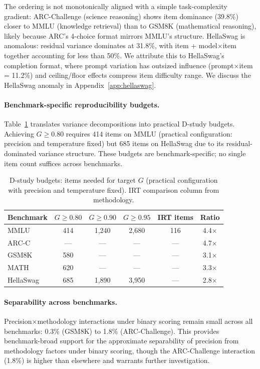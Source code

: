 \documentclass[11pt,letterpaper]{article}
\begin{document}
The ordering is not monotonically aligned with a simple task-complexity gradient: ARC-Challenge (science reasoning) shows item dominance (39.8\%) closer to MMLU (knowledge retrieval) than to GSM8K (mathematical reasoning), likely because ARC's 4-choice format mirrors MMLU's structure. HellaSwag is anomalous: residual variance dominates at 31.8\%, with item + model$\times$item together accounting for less than 50\%. We attribute this to HellaSwag's completion format, where prompt variation has outsized influence (prompt$\times$item = 11.2\%) and ceiling/floor effects compress item difficulty range. We discuss the HellaSwag anomaly in Appendix~\ref{app:hellaswag}.

\paragraph{Benchmark-specific reproducibility budgets.}
Table~\ref{tab:dstudy_budgets} translates variance decompositions into practical D-study budgets. Achieving $G \geq 0.80$ requires 414 items on MMLU (practical configuration: precision and temperature fixed) but 685 items on HellaSwag due to its residual-dominated variance structure. These budgets are benchmark-specific; no single item count suffices across benchmarks.

\begin{table}[t]
\centering
\caption{D-study budgets: items needed for target $G$ (practical configuration with precision and temperature fixed). IRT comparison column from \citet{polo2024tinybenchmarks} methodology.}
\label{tab:dstudy_budgets}
\small
\begin{tabular}{lccccc}
\toprule
\textbf{Benchmark} & \textbf{$G \geq 0.80$} & \textbf{$G \geq 0.90$} & \textbf{$G \geq 0.95$} & \textbf{IRT items} & \textbf{Ratio} \\
\midrule
MMLU      & 414  & 1,240 & 2,680 & 116 & 4.4$\times$ \\
ARC-C     & ---  & ---   & ---   & --- & 4.7$\times$ \\
GSM8K     & 580  & ---   & ---   & --- & 3.1$\times$ \\
MATH      & 620  & ---   & ---   & --- & 3.3$\times$ \\
HellaSwag & 685  & 1,890 & 3,950 & --- & 2.8$\times$ \\
\bottomrule
\end{tabular}
\end{table}

\paragraph{Separability across benchmarks.}
Precision$\times$methodology interactions under binary scoring remain small across all benchmarks: 0.3\% (GSM8K) to 1.8\% (ARC-Challenge). This provides benchmark-broad support for the approximate separability of precision from methodology factors under binary scoring, though the ARC-Challenge interaction (1.8\%) is higher than elsewhere and warrants further investigation.
\end{document}
